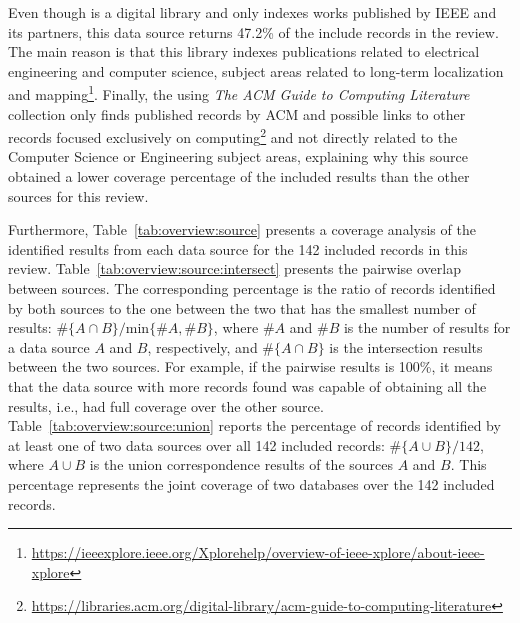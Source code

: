 Even though  is a digital library and only indexes works published by IEEE and its partners, this data source returns 47.2\% of the include records in the review. The main reason is that this library indexes publications related to electrical engineering and computer science, subject areas related to long-term localization and mapping\footnote{\url{https://ieeexplore.ieee.org/Xplorehelp/overview-of-ieee-xplore/about-ieee-xplore}}.
Finally, the  using \textit{The ACM Guide to Computing Literature} collection only finds published records by ACM and possible links to other records focused exclusively on computing\footnote{\url{https://libraries.acm.org/digital-library/acm-guide-to-computing-literature}} and not directly related to the Computer Science or Engineering subject areas, explaining why this source obtained a lower coverage percentage of the included results than the other sources for this review.

Furthermore, Table~\ref{tab:overview:source} presents a coverage analysis of the identified results from each data source for the 142 included records in this review. Table~\ref{tab:overview:source:intersect} presents the pairwise overlap between sources. The corresponding percentage is the ratio of records identified by both sources to the one between the two that has the smallest number of results: $\#\{A\cap B\} / \text{min}\{\#A,\#B\}$, where $\#A$ and $\#B$ is the number of results for a data source $A$ and $B$, respectively, and $\#\{A\cap B\}$ is the intersection results between the two sources. For example, if the pairwise results is 100\%, it means that the data source with more records found was capable of obtaining all the results, i.e., had full coverage over the other source. Table~\ref{tab:overview:source:union} reports the percentage of records identified by at least one of two data sources over all 142 included records: $\#\{A\cup B\} / 142$, where $A\cup B$ is the union correspondence results of the sources $A$ and $B$. This percentage represents the joint coverage of two databases over the 142 included records.
					
